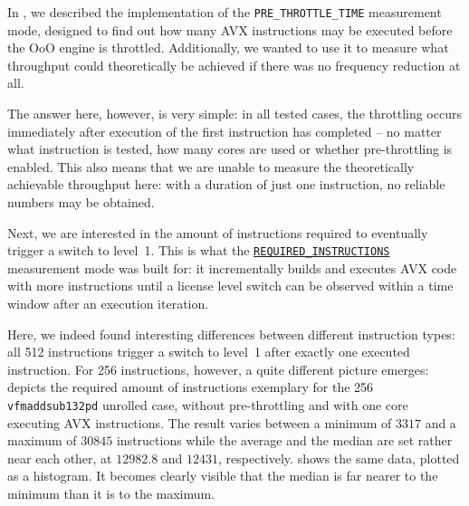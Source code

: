 In , we described the implementation of the \texttt{PRE\_THROTTLE\_TIME} measurement mode, designed to find out how many \gls{AVX} instructions may be executed before the \acrlong{OoO} engine is throttled. Additionally, we wanted to use it to measure what throughput could theoretically be achieved if there was no frequency reduction at all.

The answer here, however, is very simple: in all tested cases, the throttling occurs immediately after execution of the first instruction has completed -- no matter what instruction is tested, how many cores are used or whether pre-throttling is enabled. This also means that we are unable to measure the theoretically achievable throughput here: with a duration of just one instruction, no reliable numbers may be obtained.

Next, we are interested in the amount of instructions required to eventually trigger a switch to level~1. This is what the \hyperref[sec:analysis:design:measurementmodes:nonavxtime]{\texttt{REQUIRED\_INSTRUCTIONS}} measurement mode was built for: it incrementally builds and executes \gls{AVX} code with more instructions until a license level switch can be observed within a time window after an execution iteration.

Here, we indeed found interesting differences between different instruction types: all \SI[number-unit-product=-]{512}{\bit} instructions trigger a switch to level~1 after exactly one executed instruction. For \SI[number-unit-product=-]{256}{\bit} instructions, however, a quite different picture emerges:  depicts the required amount of instructions exemplary for the \SI{256}{\bit} \texttt{vfmaddsub132pd} unrolled case, without pre-throttling and with one core executing \gls{AVX} instructions. The result varies between a minimum of $3317$ and a maximum of $30845$ instructions while the average and the median are set rather near each other, at $12982.8$ and $12431$, respectively.  shows the same data, plotted as a histogram. It becomes clearly visible that the median is far nearer to the minimum than it is to the maximum.

